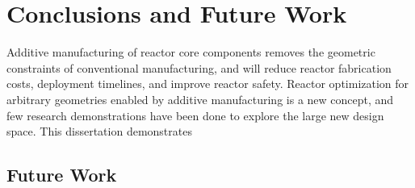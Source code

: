 \chapter{Conclusions and Future Work}
\label{chap:concl}

Additive manufacturing of reactor core components removes the geometric constraints 
of conventional manufacturing, and will reduce reactor fabrication costs, 
deployment timelines, and improve reactor safety. 
Reactor optimization for arbitrary geometries enabled by additive manufacturing is a 
new concept, and few research demonstrations have been done to explore the large 
new design space. 
This dissertation demonstrates 



\section{Future Work}
